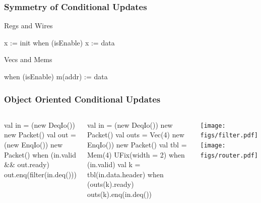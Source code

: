 \documentclass[xcolor=pdflatex,dvipsnames,table]{beamer}
\begin{document}
\begin{frame}[fragile]
\frametitle{Symmetry of Conditional Updates}

Regs and Wires
\begin{scala}
x := init
when (isEnable) {
  x := data
}
\end{scala}
 
Vecs and Mems
\begin{scala}
when (isEnable) {
  m(addr) := data
}
\end{scala}

\end{frame}

\begin{frame}[fragile]
\frametitle{Object Oriented Conditional Updates}

% 
% 
% 

\begin{columns}

{
\begin{scala}
val in  = (new DeqIo()){ new Packet() }
val out = (new EnqIo()){ new Packet() }
when (in.valid && out.ready) {
  out.enq(filter(in.deq()))
}
\end{scala}

\vskip5mm

\begin{scala}
val in   = (new DeqIo()){ new Packet() }
val outs = Vec(4){ new EnqIo()){ new Packet() } }
val tbl  = Mem(4){ UFix(width = 2) }
when (in.valid) {
  val k = tbl(in.data.header)
  when (outs(k).ready) {
    outs(k).enq(in.deq())
  }
}
\end{scala}
}


\texttt{[image: figs/filter.pdf]} \\[20mm]
\texttt{[image: figs/router.pdf]} 

\end{columns}

\end{frame}
\end{document}

